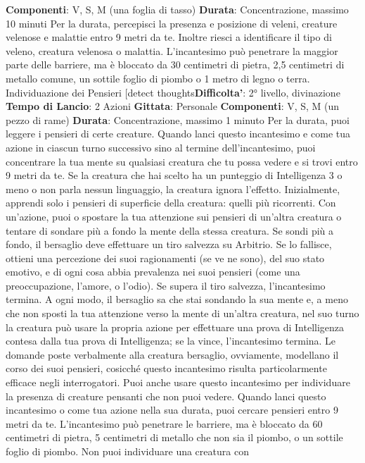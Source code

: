 \begin{multicols}{2}
\textbf{Componenti}: V, S, M (una foglia di tasso)
\textbf{Durata}: Concentrazione, massimo 10 minuti
Per la durata, percepisci la presenza e posizione di
veleni, creature velenose e malattie entro 9 metri da te.
Inoltre riesci a identificare il tipo di veleno, creatura
velenosa o malattia.
L’incantesimo può penetrare la maggior parte delle
barriere, ma è bloccato da 30 centimetri di pietra, 2,5
centimetri di metallo comune, un sottile foglio di piombo
o 1 metro di legno o terra.
Individuazione dei Pensieri
[detect thoughts\textbf{Difficolta'}:
2° livello, divinazione
\textbf{Tempo di Lancio}: 2 Azioni
\textbf{Gittata}: Personale
\textbf{Componenti}: V, S, M (un pezzo di rame)
\textbf{Durata}: Concentrazione, massimo 1 minuto
Per la durata, puoi leggere i pensieri di certe creature.
Quando lanci questo incantesimo e come tua azione in
ciascun turno successivo sino al termine
dell’incantesimo, puoi concentrare la tua mente su
qualsiasi creatura che tu possa vedere e si trovi entro 9
metri da te. Se la creatura che hai scelto ha un
punteggio di Intelligenza 3 o meno o non parla nessun
linguaggio, la creatura ignora l’effetto.
Inizialmente, apprendi solo i pensieri di superficie della
creatura: quelli più ricorrenti. Con un’azione, puoi o
spostare la tua attenzione sui pensieri di un’altra
creatura o tentare di sondare più a fondo la mente della
stessa creatura. Se sondi più a fondo, il bersaglio deve
effettuare un tiro salvezza su Arbitrio. Se lo fallisce,
ottieni una percezione dei suoi ragionamenti (se ve ne
sono), del suo stato emotivo, e di ogni cosa abbia
prevalenza nei suoi pensieri (come una
preoccupazione, l’amore, o l’odio). Se supera il tiro
salvezza, l’incantesimo termina. A ogni modo, il
bersaglio sa che stai sondando la sua mente e, a meno
che non sposti la tua attenzione verso la mente di
un’altra creatura, nel suo turno la creatura può usare la
propria azione per effettuare una prova di Intelligenza
contesa dalla tua prova di Intelligenza; se la vince,
l’incantesimo termina.
Le domande poste verbalmente alla creatura bersaglio,
ovviamente, modellano il corso dei suoi pensieri,
cosicché questo incantesimo risulta particolarmente
efficace negli interrogatori.
Puoi anche usare questo incantesimo per individuare la
presenza di creature pensanti che non puoi vedere.
Quando lanci questo incantesimo o come tua azione
nella sua durata, puoi cercare pensieri entro 9 metri da
te. L’incantesimo può penetrare le barriere, ma è
bloccato da 60 centimetri di pietra, 5 centimetri di
metallo che non sia il piombo, o un sottile foglio di
piombo. Non puoi individuare una creatura con

\end{multicols}

